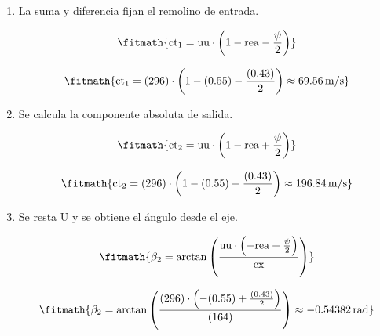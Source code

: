 \begin{enumerate}

\item La suma y diferencia fijan el remolino de entrada.

\[\fitmath{\mathrm{ct}_{1}=\mathrm{uu}\cdot \left(1-\mathrm{rea}-\frac{\psi}{2}\right)}\]

\[\fitmath{\mathrm{ct}_{1}=(296)\cdot \left(1-(0.55)-\frac{(0.43)}{2}\right)\approx 69.56\,\mathrm{m/s}}\]

\item Se calcula la componente absoluta de salida.

\[\fitmath{\mathrm{ct}_{2}=\mathrm{uu}\cdot \left(1-\mathrm{rea}+\frac{\psi}{2}\right)}\]

\[\fitmath{\mathrm{ct}_{2}=(296)\cdot \left(1-(0.55)+\frac{(0.43)}{2}\right)\approx 196.84\,\mathrm{m/s}}\]

\item Se resta U y se obtiene el ángulo desde el eje.

\[\fitmath{\beta_{2}=\arctan\left(\frac{\mathrm{uu}\cdot \left(-\mathrm{rea}+\frac{\psi}{2}\right)}{\mathrm{cx}}\right)}\]

\[\fitmath{\beta_{2}=\arctan\left(\frac{(296)\cdot \left(-(0.55)+\frac{(0.43)}{2}\right)}{(164)}\right)\approx -0.54382\,\mathrm{rad}}\]

\end{enumerate}
